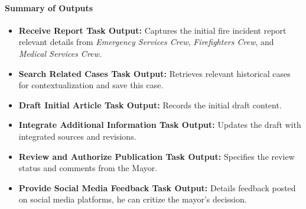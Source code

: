 \paragraph{Summary of Outputs}
\begin{itemize}
    \item \textbf{Receive Report Task Output:} Captures the initial fire incident report relevant details from \textit{Emergency Services Crew}, \textit{Firefighters Crew}, and \textit{Medical Services Crew}.
    \item \textbf{Search Related Cases Task Output:} Retrieves relevant historical cases for contextualization and save this case.
    \item \textbf{Draft Initial Article Task Output:} Records the initial draft content.
    \item \textbf{Integrate Additional Information Task Output:} Updates the draft with integrated sources and revisions.
    \item \textbf{Review and Authorize Publication Task Output:} Specifies the review status and comments from the Mayor.
    \item \textbf{Provide Social Media Feedback Task Output:} Details feedback posted on social media platforms, he can critize the mayor's decission.
\end{itemize}